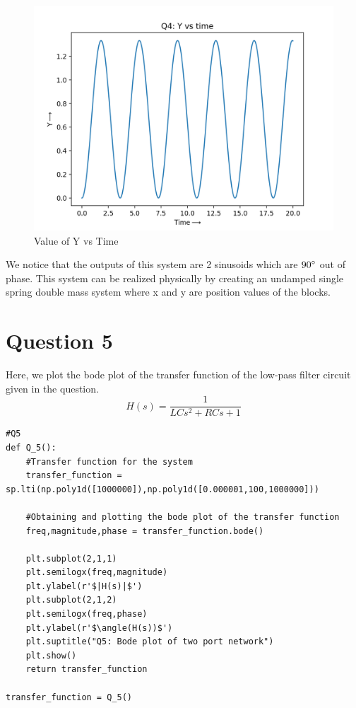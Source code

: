 \documentclass[11pt, a4paper]{article}
\begin{document}
\begin{figure}[h!]
\centering
\includegraphics[scale=0.6]{Q4_2.png}
\caption{Value of Y vs Time}
\label{Value of Y vs Time}
\end{figure}

We notice that the outputs of this system are 2 sinusoids which are $90\degree$ out of phase. This system can be realized physically by creating an undamped single spring double mass system where x and y are position values of the blocks.

\section{Question 5}
Here, we plot the bode plot of the transfer function of the low-pass filter circuit given in the question.
\begin{equation}
    H(s) = \frac{1}{LCs^2 + RCs + 1}
\end{equation}

\begin{lstlisting}
#Q5
def Q_5():
	#Transfer function for the system
	transfer_function = sp.lti(np.poly1d([1000000]),np.poly1d([0.000001,100,1000000]))

	#Obtaining and plotting the bode plot of the transfer function
	freq,magnitude,phase = transfer_function.bode()

	plt.subplot(2,1,1)
	plt.semilogx(freq,magnitude)
	plt.ylabel(r'$|H(s)|$')
	plt.subplot(2,1,2)
	plt.semilogx(freq,phase)
	plt.ylabel(r'$\angle(H(s))$')
	plt.suptitle("Q5: Bode plot of two port network")
	plt.show()
	return transfer_function

transfer_function = Q_5()
\end{lstlisting}
\end{document}
